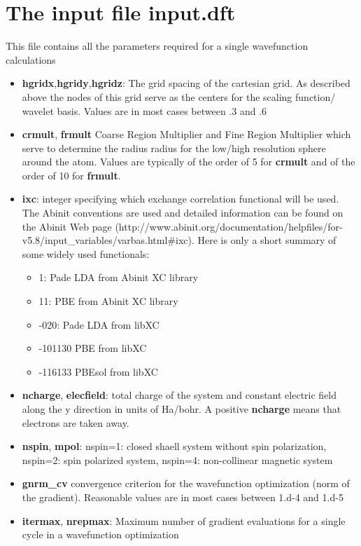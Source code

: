 \documentclass[a4paper,11pt]{report}
\begin{document}
\section{The input file input.dft}
This file contains all the parameters required for a single wavefunction calculations
\begin{itemize}
\item {\bf hgridx},{\bf hgridy},{\bf hgridz}: The grid spacing of the cartesian grid. As 
        described above the nodes of this grid serve as the centers for the scaling function/ wavelet basis. 
       Values are in most cases between .3 and .6

\item {\bf crmult}, {\bf frmult} Coarse Region Multiplier and Fine Region Multiplier which serve to determine the radius
      radius for the low/high resolution sphere around the atom. 
      Values are typically of the order of 5 for {\bf crmult} and of the order of 10 for  {\bf frmult}.
\item {\bf ixc}: integer specifying which exchange correlation functional will be used. The Abinit conventions are 
      used and detailed information can be found on the Abinit Web page 
      (http://www.abinit.org/documentation/helpfiles/for-v5.8/input\_variables/varbas.html\#ixc). 
       Here is only a short summary of some widely used functionals:
      \begin{itemize}
      \item  1: Pade LDA from Abinit XC library
      \item  11: PBE from Abinit XC library
      \item -020: Pade LDA from libXC
      \item -101130  PBE from  libXC
      \item -116133 PBEsol from libXC
      \end{itemize}
\item {\bf ncharge}, {\bf elecfield}: total charge of the system and constant electric field along the y direction in units of Ha/bohr. 
      A positive {\bf ncharge} means that electrons are taken away.
\item {\bf nspin}, {\bf mpol}: nspin=1: closed shaell system without spin polarization, nspin=2: spin polarized 
      system, nspin=4: non-collinear magnetic system
\item {\bf gnrm\_cv} convergence criterion for the wavefunction optimization (norm of the gradient).
      Reasonable values are in most cases between 1.d-4 and 1.d-5
\item {\bf itermax}, {\bf nrepmax}: Maximum number of gradient evaluations for a single cycle in a wavefunction optimization 

\end{itemize}
\end{document}

